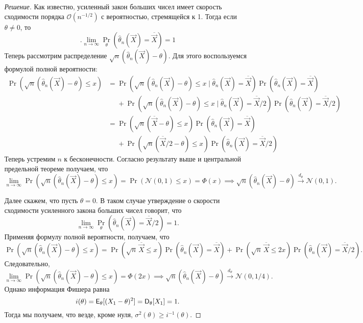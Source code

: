 \begin{proof}[Решение]
    Как известно, усиленный закон больших чисел имеет скорость сходимости порядка $\mathcal{O}(n^{-1/2})$ с вероятностью, стремящейся к 1. Тогда если $\theta \neq 0$, то
    \[
        .\lim\limits_{n \to \infty} \Pr_{\theta}(\hat{\theta}_{n}(\vec{X}) = \overline{\vec{X}}) = 1
    \]
    Теперь рассмотрим распределение $\sqrt{n}(\hat{\theta}_{n}(\vec{X}) - \theta)$. Для этого воспользуемся формулой полной вероятности:
    \begin{align*}
        \Pr(\sqrt{n}(\hat{\theta}_{n}(\vec{X}) - \theta) \leq x)
        &= \Pr(\sqrt{n}(\hat{\theta}_{n}(\vec{X}) - \theta) \leq x \mid \hat{\theta}_{n}(\vec{X}) = \overline{\vec{X}})\Pr(\hat{\theta}_{n}(\vec{X}) = \overline{\vec{X}}) \\
        &\phantom{=}+ \Pr(\sqrt{n}(\hat{\theta}_{n}(\vec{X}) - \theta) \leq x \mid \hat{\theta}_{n}(\vec{X}) = \overline{\vec{X}}/2)\Pr(\hat{\theta}_{n}(\vec{X}) = \overline{\vec{X}}/2) \\
        &= \Pr(\sqrt{n}(\overline{\vec{X}} - \theta) \leq x)\Pr(\hat{\theta}_{n}(\vec{X}) = \overline{\vec{X}}) \\
        &\phantom{=}+ \Pr(\sqrt{n}(\overline{\vec{X}}/2 - \theta) \leq x)\Pr(\hat{\theta}_{n}(\vec{X}) = \overline{\vec{X}}/2)
    \end{align*}
    Теперь устремим $n$ к бесконечности. Согласно результату выше и центральной предельной теореме получаем, что
    \[
        \lim\limits_{n \to \infty} \Pr(\sqrt{n}(\hat{\theta}_{n}(\vec{X}) - \theta) \leq x)
        = \Pr(\mathcal{N}(0, 1) \leq x) = \Phi(x) 
        \implies
        \sqrt{n}(\hat{\theta}_{n}(\vec{X}) - \theta) \xrightarrow{d_{\theta}} \mathcal{N}(0, 1).
    \]

    Далее скажем, что пусть $\theta = 0$. В таком случае утверждение о скорости сходимости усиленного закона больших чисел говорит, что
    \[
        \lim\limits_{n \to \infty} \Pr_{\theta}(\hat{\theta}_{n}(\vec{X}) = \overline{\vec{X}}/2) = 1.
    \]
    Применяя формулу полной вероятности, получаем, что
    \[
        \Pr(\sqrt{n}(\hat{\theta}_{n}(\vec{X}) - \theta) \leq x)
        = \Pr(\sqrt{n}\,\overline{\vec{X}} \leq x)\Pr(\hat{\theta}_{n}(\vec{X}) = \overline{\vec{X}}) + \Pr(\sqrt{n}\,\overline{\vec{X}} \leq 2x)\Pr(\hat{\theta}_{n}(\vec{X}) = \overline{\vec{X}}/2).
    \]
    Следовательно,
    \[
        \lim\limits_{n \to \infty} \Pr(\sqrt{n}(\hat{\theta}_{n}(\vec{X}) - \theta) \leq x) = \Phi(2x)
        \implies
        \sqrt{n}(\hat{\theta}_{n}(\vec{X}) - \theta) \xrightarrow{d_{\theta}} \mathcal{N}(0, 1/4).
    \]
    Однако информация Фишера равна
    \[
        i(\theta) = \operatorname{\mathsf{E}}_{\theta}[(X_{1} - \theta)^{2}] = \operatorname{\mathsf{D}}_{\theta}[X_{1}] = 1.
    \]
    Тогда мы получаем, что везде, кроме нуля, $\sigma^{2}(\theta) \geq i^{-1}(\theta)$.
\end{proof}